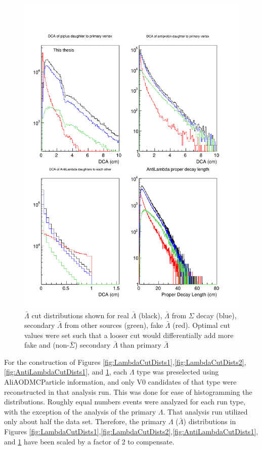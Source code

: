 \begin{figure}
\includegraphics[width=36pc]{Figures/2014-03-31-Distribution-AntiLambda-4Types-DCA-DCA-DCA-DecayLength.pdf}
\caption[$\bar{\Lambda}$ cut distributions]{$\bar{\Lambda}$ cut distributions shown for real $\bar{\Lambda}$ (black), $\bar{\Lambda}$ from $\Sigma$ decay (blue), secondary $\bar{\Lambda}$ from other sources (green), fake $\bar{\Lambda}$ (red). Optimal cut values were set such that a looser cut would differentially add more fake and (non-$\bar{\Sigma}$) secondary $\bar{\Lambda}$ than primary $\bar{\Lambda}$}
\label{fig:AntiLambdaCutDists2}
\end{figure}

For the construction of Figures \ref{fig:LambdaCutDists1},\ref{fig:LambdaCutDists2},\ref{fig:AntiLambdaCutDists1}, and \ref{fig:AntiLambdaCutDists2}, each $\Lambda$ type was preselected using AliAODMCParticle information, and only V0 candidates of that type were reconstructed in that analysis run. This was done for ease of histogramming the distributions.  Roughly equal numbers events were analyzed for each run type, with the exception of the analysis of the primary $\Lambda$.  That analysis run utilized only about half the data set.  Therefore, the primary $\Lambda$ ($\bar{\Lambda}$) distributions in Figures \ref{fig:LambdaCutDists1},\ref{fig:LambdaCutDists2},\ref{fig:AntiLambdaCutDists1}, and \ref{fig:AntiLambdaCutDists2} have been scaled by a factor of 2 to compensate.

